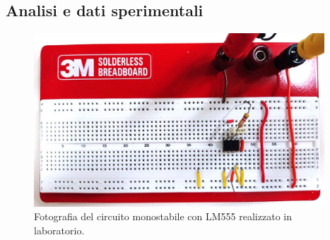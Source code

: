 \documentclass{report}
\begin{document}
\subsection{Analisi e dati sperimentali}
\begin{figure}[h]
	\centering
	\includegraphics[height=6.5cm]{immagini/circuito2}
	\caption{Fotografia del circuito monostabile con LM555 realizzato in laboratorio.}
	\label{figura:circuito2}
\end{figure}

\end{document}
